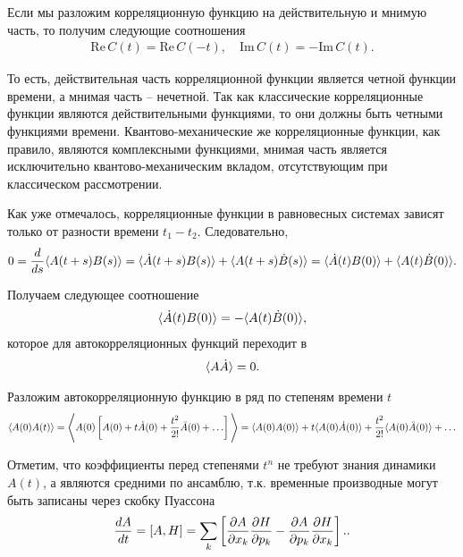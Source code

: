 Если мы разложим корреляционную функцию на действительную и мнимую часть, то получим следующие соотношения 
\begin{gather}
    \text{Re} \, C(t) = \text{Re} \, C(-t), \quad \text{Im} \, C(t) = -\text{Im} \, C(t).
\end{gather}

То есть, действительная часть корреляционной функции является четной функции времени, а мнимая часть -- нечетной. Так как классические корреляционные функции являются действительными функциями, то они должны быть четными функциями времени. Квантово-механические же корреляционные функции, как правило, являются комплексными функциями, мнимая часть является исключительно квантово-механическим вкладом, отсутствующим при классическом рассмотрении.


Как уже отмечалось, корреляционные функции в равновесных системах зависят только от разности времени $t_1 - t_2$. Следовательно,
\begin{gather}
    0 = \frac{d}{ds} \langle  A(t+s) B(s)  \rangle = \langle  \dot{A}(t+s) B(s)  \rangle + \langle  A(t+s) \dot{B}(s)  \rangle = \langle  \dot{A}(t) B(0)  \rangle + \langle  A(t) \dot{B}(0)  \rangle.
\end{gather}

Получаем следующее соотношение 
\begin{gather}
    \langle \dot{A}(t)B(0) \rangle = -\langle A(t)\dot{B}(0) \rangle, 
\end{gather}
которое для автокорреляционных функций переходит в 
\begin{gather}
    \langle A \dot{A} \rangle = 0. \label{litreview-temp1}
\end{gather}

Разложим автокорреляционную функцию в ряд по степеням времени $t$
\begin{gather}
    \mean{A(0) A(t)} = \Bigg\langle A(0) \lsq A(0) + t \dot{A}(0) + \frac{t^2}{2!} \ddot{A}(0) + \dots \rsq \Bigg\rangle = \mean{A(0) A(0)} + t \mean{A(0) \dot{A}(0)} + \frac{t^2}{2!} \mean{A(0) \ddot{A}(0)} + \dots \label{litreview-correlation-function-series}
\end{gather}

Отметим, что коэффициенты перед степенями $t^n$ не требуют знания динамики $A(t)$, а являются средними по ансамблю, т.к. временные производные могут быть записаны через скобку Пуассона
\begin{gather}
    \frac{dA}{dt} = \left[ A, H \right] = \sum_k \left[ \frac{\partial A}{\partial x_k} \frac{\partial H}{\partial p_k} - \frac{\partial A}{\partial p_k} \frac{\partial H}{\partial x_k} \right]. \label{litreview-poisson-bracket}.
\end{gather}

